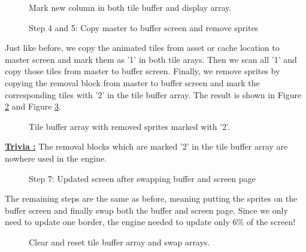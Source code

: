 \documentclass[book.tex]{subfiles}
\begin{document}
\begin{figure}[H]
\centering
 \caption{Mark new column in both tile buffer and display array.}
 \label{fig:kc4_6_tile_final}
\end{figure}


\begin{figure}[H]
\centering
 \caption{Step 4 and 5: Copy master to buffer screen and remove sprites}
 \label{fig:kc4_6_update_buffer}
\end{figure}



Just like before, we copy the animated tiles from asset or cache location to master screen and mark them as '1' in both tile arays. Then we scan all '1' and copy those tiles from master to buffer screen. Finally, we remove sprites by copying the removal block from master to buffer screen and mark the corresponding tiles with '2' in the tile buffer array. The result is shown in Figure \ref{fig:kc4_6_update_buffer} and Figure \ref{fig:kc4_6_update_array}.

\begin{figure}[H]
\centering
 \caption{Tile buffer array with removed sprites marked with '2'.}
 \label{fig:kc4_6_update_array}
\end{figure}

\par
\textbf{\underline{Trivia :}} The removal blocks which are marked '2' in the tile buffer array are nowhere used in the engine.\\
  \par
\pagebreak

\begin{figure}[H]
\centering
 \caption{Step 7: Updated screen after swapping buffer and screen page}
 \label{fig:k4_6_update_final}
\end{figure}


The remaining steps are the same as before, meaning putting the sprites on the buffer screen and finally swap both the buffer and screen page. Since we only need to update one border, the engine needed to update only 6\% of the screen!\\

\begin{figure}[H]
\centering
 \caption{Clear and reset tile buffer array and swap arrays.}
 \label{fig:kc4_6_final}
\end{figure}
\end{document}
